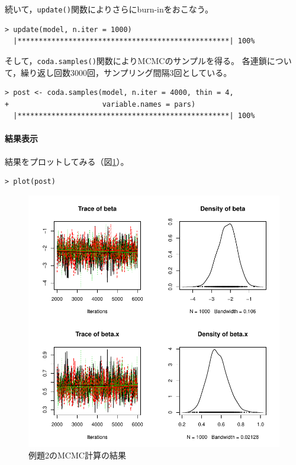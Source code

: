 \documentclass[11pt,uplatex]{jsarticle}
\begin{document}
続いて，\texttt{update()}関数によりさらにburn-inをおこなう。
\begin{lstlisting}
> update(model, n.iter = 1000)
  |**************************************************| 100%
\end{lstlisting}

そして，\texttt{coda.samples()}関数によりMCMCのサンプルを得る。
各連鎖について，繰り返し回数3000回，サンプリング間隔3回としている。

\begin{lstlisting}
> post <- coda.samples(model, n.iter = 4000, thin = 4,
+                      variable.names = pars)
  |**************************************************| 100%
\end{lstlisting}


\paragraph{結果表示}

結果をプロットしてみる（図\ref{plot_coda}）。
\begin{lstlisting}
> plot(post)
\end{lstlisting}


\begin{figure}[htbp]
	\begin{center}
		\includegraphics[bb=0 0 400 400, clip, width=300 bp]{example2.pdf}
	\end{center}
	\caption{例題2のMCMC計算の結果}
	\label{plot_coda}
\end{figure}
\end{document}
